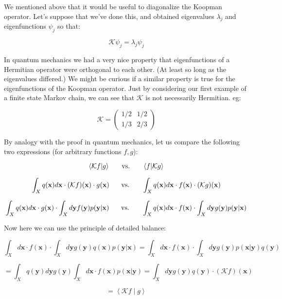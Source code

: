 \documentclass[]{article}
\newcommand{\braket}[2]{\left\langle #1 \middle| #2 \right\rangle}
\newcommand{\w}[1]{\mathbf{#1}}
\newcommand{\Kp}{\mathcal{K}}
\begin{document}

We mentioned above that it would be useful to diagonalize the Koopman operator. Let's suppose that we've done this, and obtained eigenvalues $\lambda_j$ and eigenfunctions $\psi_j$ so that:

$$
\Kp \psi_j = \lambda_j \psi_j
$$

In quantum mechanics we had a very nice property that eigenfunctions of a Hermitian operator were orthogonal to each other. (At least so long as the eigenvalues differed.) We might be curious if a similar property is true for the eigenfunctions of the Koopman operator. Just by considering our first example of a finite state Markov chain, we can see that $\Kp$ is not necessarily Hermitian. eg:

$$
\Kp = \begin{pmatrix}
	1/2 & 1/2\\
	1/3 & 2/3
\end{pmatrix}
$$

By analogy with the proof in quantum mechanics, let us compare the following two expressions (for arbitrary functions $f, g$):

$$
\braket{\Kp f}{g}
\hspace{0.5cm}\text{  vs.  }\hspace{0.5cm}
\braket{f}{\Kp g}
$$

$$
\int_X q(\w{x})d\w{x} \cdot (\Kp f)(\w{x}) \cdot  g(\w{x})
\hspace{0.5cm}\text{  vs.  }\hspace{0.5cm}
\int_X q(\w{x})d\w{x} \cdot f(\w{x}) \cdot (\Kp  g)(\w{x})
$$

$$
\int_X q(\w{x})d\w{x} \cdot  g(\w{x}) \cdot \int_X d\w{y} f(\w{y})p(\w{y} | \w{x})
\hspace{0.5cm}\text{  vs.  }\hspace{0.5cm}
\int_X q(\w{x})d\w{x} \cdot f(\w{x}) \cdot \int_X d\w{y} g(\w{y})p(\w{y} | \w{x})
$$

Now here we can use the principle of detailed balance:

$$
\int_X d\w{x} \cdot f(\w{x}) \cdot \int_X d\w{y} g(\w{y}) q(\w{x}) p(\w{y} | \w{x})
= \int_X d\w{x} \cdot f(\w{x}) \cdot
\int_X d\w{y} g(\w{y})p(\w{x}|\w{y})q(\w{y})
$$

$$
=
\int_X q(\w{y}) d\w{y} g(\w{y})
\int_X d\w{x} \cdot f(\w{x}) p(\w{x}|\w{y})
= \int_X d\w{y} g(\w{y})q(\w{y})\cdot (\Kp f)(\w{x})
$$

$$
= \braket{\Kp f}{ g}
$$
\end{document}
